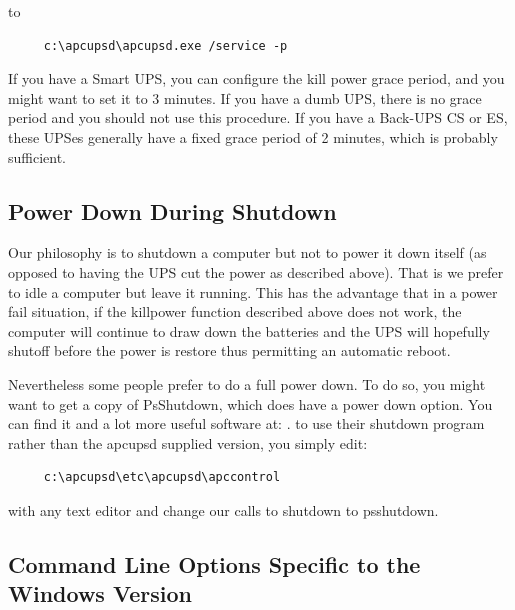 {{{{{{{to 

\footnotesize
\begin{verbatim}
     c:\apcupsd\apcupsd.exe /service -p
\end{verbatim}
\normalsize

If you have a Smart UPS, you can configure the kill power grace period, and
you might want to set it to 3 minutes. If you have a dumb UPS, there is no
grace period and you should not use this procedure. If you have a Back-UPS CS
or ES, these UPSes generally have a fixed grace period of 2 minutes, which is
probably sufficient. 

\label{Power-Down-During-Shutdown}

\subsection*{Power Down During Shutdown}

\label{index-Windows_002c-Power-down-184}
\label{index-Power-down_002c-Windows-185}
Our philosophy is to shutdown a computer but not to power it down itself (as
opposed to having the UPS cut the power as described above). That is we prefer
to idle a computer but leave it running. This has the advantage that in a
power fail situation, if the killpower function described above does not work,
the computer will continue to draw down the batteries and the UPS will
hopefully shutoff before the power is restore thus permitting an automatic
reboot.  

Nevertheless some people prefer to do a full power down. To do so, you might
want to get a copy of PsShutdown, which does have a power down option. You can
find it and a lot more useful software at: 
. to use their shutdown program
rather than the apcupsd supplied version, you simply edit: 

\footnotesize
\begin{verbatim}
     c:\apcupsd\etc\apcupsd\apccontrol
\end{verbatim}
\normalsize

with any text editor and change our calls to shutdown to psshutdown. 

\label{Command-Line-Options-Specific-to-the-Windows-Version}

\subsection*{Command Line Options Specific to the Windows Version}

}}}}}}}
